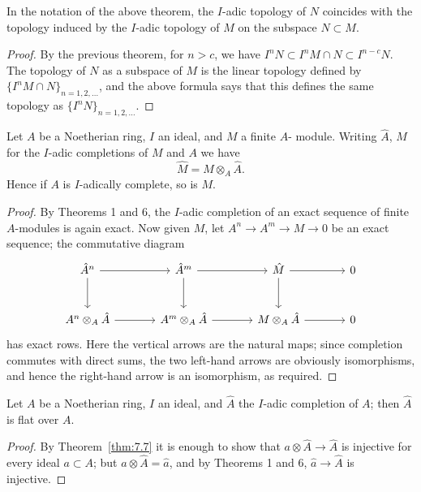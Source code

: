 \begin{theorem}\label{thm:8.6}
In the notation of the above theorem, the $I$-adic topology of
$N$ coincides with the topology induced by the $I$-adic topology of $M$ on the
subspace $N \subset M$.
\end{theorem}

\begin{proof}
By the previous theorem, for $n > c$, we have $I^nN \subset I^nM \cap N
\subset I^{n-c}N$. The topology of $N$ as a subspace of $M$ is the linear topology
defined by $\{I^nM \cap N\}_{n=1,2,\ldots}$, and the above formula says that this defines the
same topology as $\{I^nN\}_{n=1,2,\ldots}$.
\end{proof}

\begin{theorem}\label{thm:8.7}
Let $A$ be a Noetherian ring, $I$ an ideal, and $M$ a finite $A$-
module. Writing $\hat{A}$, $\hat{M}$ for the $I$-adic completions of $M$ and $A$ we have
\[
  \hat{M} = M \otimes_A \hat{A}.
\]
Hence if $A$ is $I$-adically complete, so is $M$.
\end{theorem}

\begin{proof}
By Theorems 1 and 6, the $I$-adic completion of an exact sequence of
finite $A$-modules is again exact. Now given $M$, let $A^n \to A^m \to M \to 0$ be
an exact sequence; the commutative diagram
\[
  \begin{tikzcd}[column sep=large, row sep=large]
    \hat{A}^n \arrow[r] \arrow[d] & \hat{A}^m \arrow[r] \arrow[d] & \hat{M} \arrow[r] \arrow[d] & 0 \\
    A^n \otimes_A \hat{A} \arrow[r] & A^m \otimes_A \hat{A} \arrow[r] & M \otimes_A \hat{A} \arrow[r] & 0
  \end{tikzcd}
\]
has exact rows. Here the vertical arrows are the natural maps; since
completion commutes with direct sums, the two left-hand arrows are
obviously isomorphisms, and hence the right-hand arrow is an
isomorphism, as required.
\end{proof}

\begin{theorem}\label{thm:8.8}
Let $A$ be a Noetherian ring, $I$ an ideal, and $\hat{A}$ the $I$-adic
completion of $A$; then $\hat{A}$ is flat over $A$.
\end{theorem}

\begin{proof}
By Theorem~\ref{thm:7.7} it is enough to show that $a \otimes \hat{A} \to \hat{A}$ is injective
for every ideal $a \subset A$; but $a \otimes \hat{A} = \hat{a}$, and by Theorems 1 and 6, $\hat{a} \to \hat{A}$ is
injective.
\end{proof}

